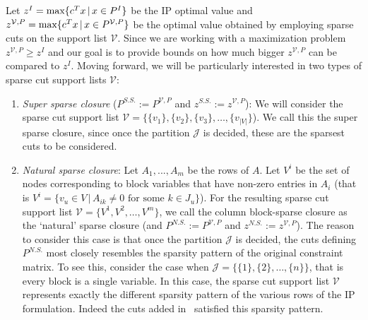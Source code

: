 \documentclass[smallextended]{svjour3}
\begin{document}
Let $z^{I} = \textup{max}\{c^Tx \,|\, x \in P^{I}\}$ be the IP optimal value and $z^{\mathcal{V}, P} = \textup{max}\{c^Tx \,|\, x \in P^{\mathcal{V}, P}\}$ be the optimal value obtained by employing sparse cuts on the support list ${\mathcal{V}}$. Since we are working with a maximization problem $z^{{\mathcal{V}}, P} \ge z^I$ and our goal is to provide bounds on how much bigger $z^{{\mathcal{V}}, P}$ can be compared to $z^I$. Moving forward, we will be particularly interested in two types of sparse cut support lists $\mathcal{V}$:
\begin{enumerate}
\item \emph{Super sparse closure} ($P^{S. S.} := P^{\mathcal{V}, P}$ and $z^{S. S.} := z^{\mathcal{V}, P}$): We will consider the sparse cut support list $\mathcal{V} = \{ \{v_1\}, \{v_2\}, \{v_3\}, \dots, \{v_{|V|}\}$). We call this the super sparse closure, since once the partition $\mathcal{J}$ is decided, these are the sparsest cuts to be considered.  
\item \emph{Natural sparse closure}: Let $A_1, ...,A_m$ be the rows of $A$. Let $V^i$ be the set of nodes corresponding to block variables that have non-zero entries in $A_i$ (that is $V^i = \{ v_u\in V\,|\, A_{ik} \neq 0 \textrm{ for some } k \in J_u\}$).
For the resulting sparse cut support list $\mathcal{V} = \{ V^1, V^2, \dots, V^m\}$, we call the column block-sparse closure as the `natural' sparse closure (and $P^{N. S.} := P^{\mathcal{V}, P}$ and $z^{N. S.} := z^{\mathcal{V}, P}$). The reason to consider this case is that once the partition $\mathcal{J}$ is decided, the cuts defining $P^{N.S.}$ most closely resembles the sparsity pattern of the original constraint matrix. To see this, consider the case when $\mathcal{J} = \{\{1\}, \{2\}, \dots, \{n\}\}$, that is every block is a single variable. In this case, the sparse cut support list $\mathcal{V}$ represents exactly the different sparsity pattern of the various rows of the IP formulation. Indeed the cuts added in~\cite{crowder:jo:pa:1983} satisfied this sparsity pattern. 
\end{enumerate}
\end{document}

